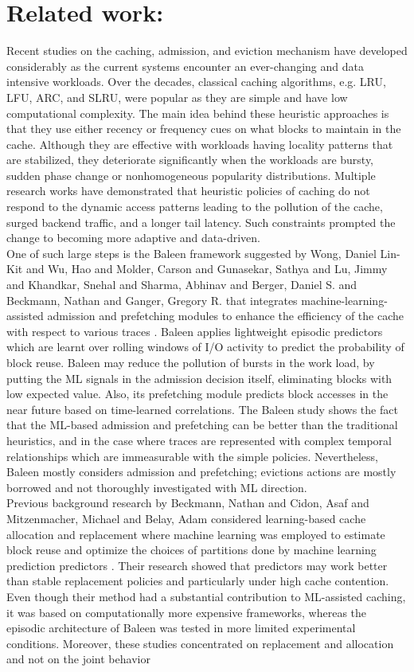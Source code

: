 \documentclass[sigconf]{acmart}
\begin{document}
{\clearpage
\section{Related work:}
\large Recent studies on the caching, admission, and eviction mechanism have developed considerably as the current systems encounter an ever-changing and data intensive workloads. Over the decades, classical caching algorithms, e.g. LRU, LFU, ARC, and SLRU, were popular as they are simple and have low computational complexity. The main idea behind these heuristic approaches is that they use either recency or frequency cues on what blocks to maintain in the cache. Although they are effective with workloads having locality patterns that are stabilized, they deteriorate significantly when the workloads are bursty, sudden phase change or nonhomogeneous popularity distributions. Multiple research works have demonstrated that heuristic policies of caching do not respond to the dynamic access patterns leading to the pollution of the cache, surged backend traffic, and a longer tail latency. Such constraints prompted the change to becoming more adaptive and data-driven.\\\indent One of such large steps is the Baleen framework suggested by Wong, Daniel Lin-Kit and Wu, Hao and Molder, Carson and Gunasekar, Sathya and Lu, Jimmy and Khandkar, Snehal and Sharma, Abhinav and Berger, Daniel S. and Beckmann, Nathan and Ganger, Gregory R. that integrates machine-learning-assisted admission and prefetching modules to enhance the efficiency of the cache with respect to various traces \cite{wong2024baleen}. Baleen applies lightweight episodic predictors which are learnt over rolling windows of I/O activity to predict the probability of block reuse. Baleen may reduce the pollution of bursts in the work load, by putting the ML signals in the admission decision itself, eliminating blocks with low expected value. Also, its prefetching module predicts block accesses in the near future based on time-learned correlations. The Baleen study shows the fact that the ML-based admission and prefetching can be better than the traditional heuristics, and in the case where traces are represented with complex temporal relationships which are immeasurable with the simple policies. Nevertheless, Baleen mostly considers admission and prefetching; evictions actions are mostly borrowed and not thoroughly investigated with ML direction.\\\indent Previous background research by Beckmann, Nathan and Cidon, Asaf and Mitzenmacher, Michael and Belay, Adam considered learning-based cache allocation and replacement where machine learning was employed to estimate block reuse and optimize the choices of partitions done by machine learning prediction predictors \cite{beckmann2015optimizing}. Their research showed that predictors may work better than stable replacement policies and particularly under high cache contention. Even though their method had a substantial contribution to ML-assisted caching, it was based on computationally more expensive frameworks, whereas the episodic architecture of Baleen was tested in more limited experimental conditions. Moreover, these studies concentrated on replacement and allocation and not on the joint behavior }
\end{document}

